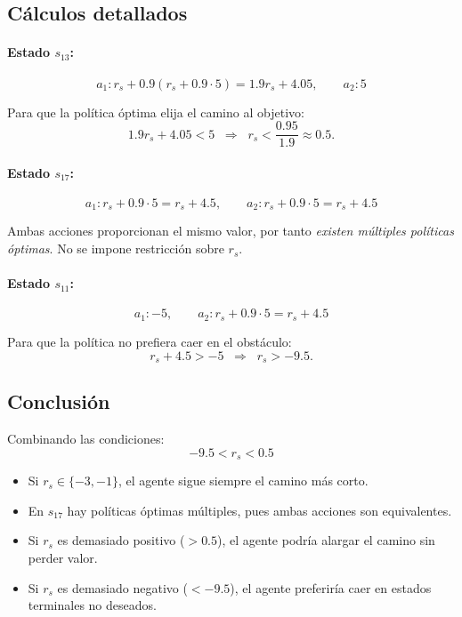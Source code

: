 \documentclass[a4paper,12pt]{article}
\begin{document}
\subsection*{Cálculos detallados}

\paragraph{Estado $s_{13}$:}
\[
a_1 : r_s + 0.9(r_s + 0.9 \cdot 5) = 1.9r_s + 4.05,
\qquad
a_2 : 5
\]

Para que la política óptima elija el camino al objetivo:
\[
1.9r_s + 4.05 < 5 \;\;\Rightarrow\;\; r_s < \frac{0.95}{1.9} \approx 0.5.
\]

\paragraph{Estado $s_{17}$:}
\[
a_1 : r_s + 0.9 \cdot 5 = r_s + 4.5,
\qquad
a_2 : r_s + 0.9 \cdot 5 = r_s + 4.5
\]

Ambas acciones proporcionan el mismo valor, por tanto \emph{existen múltiples políticas óptimas}.
No se impone restricción sobre $r_s$.

\paragraph{Estado $s_{11}$:}
\[
a_1 : -5,
\qquad
a_2 : r_s + 0.9 \cdot 5 = r_s + 4.5
\]

Para que la política no prefiera caer en el obstáculo:
\[
r_s + 4.5 > -5 \;\;\Rightarrow\;\; r_s > -9.5.
\]

\subsection*{Conclusión}

Combinando las condiciones:
\[
-9.5 < r_s < 0.5
\]

\begin{itemize}
  \item Si $r_s \in \{-3,-1\}$, el agente sigue siempre el camino más corto.
  \item En $s_{17}$ hay políticas óptimas múltiples, pues ambas acciones son equivalentes.
  \item Si $r_s$ es demasiado positivo ($>0.5$), el agente podría alargar el camino sin perder valor.
  \item Si $r_s$ es demasiado negativo ($<-9.5$), el agente preferiría caer en estados terminales no deseados.
\end{itemize}
\end{document}
